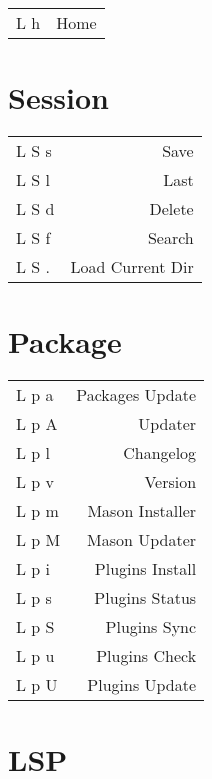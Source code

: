 \documentclass[
  ,landscape
  ,columns=4
]{cheatsheet}
\begin{document}
\begin{tabular}{lr}
	L h & Home \\
\end{tabular}

\section{Session}

\begin{tabular}{lr}
	L S s & Save             \\
	L S l & Last             \\
	L S d & Delete           \\
	L S f & Search           \\
	L S . & Load Current Dir \\
\end{tabular}

\section{Package}

\begin{tabular}{lr}
	L p a & Packages Update \\
	L p A & Updater         \\
	L p l & Changelog       \\
	L p v & Version         \\
	L p m & Mason Installer \\
	L p M & Mason Updater   \\
	L p i & Plugins Install \\
	L p s & Plugins Status  \\
	L p S & Plugins Sync    \\
	L p u & Plugins Check   \\
	L p U & Plugins Update  \\
\end{tabular}

\section{LSP}
\end{document}
